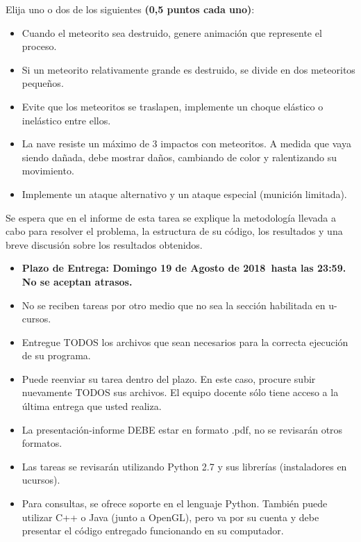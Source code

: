\documentclass[letterpaper,11pt]{article} %
\def\plazoentrega {Domingo 19 de Agosto de 2018}
\begin{document}

Elija uno o dos de los siguientes \textbf{(0,5 puntos cada uno)}:

\begin{itemize}
	\item Cuando el meteorito sea destruido, genere animación que represente el proceso.
	\item Si un meteorito relativamente grande es destruido, se divide en dos meteoritos pequeños.
	\item Evite que los meteoritos se traslapen, implemente un choque elástico o inelástico entre ellos.
	\item La nave resiste un máximo de 3 impactos con meteoritos. A medida que vaya siendo dañada, debe mostrar daños, cambiando de color y ralentizando su movimiento.
	\item Implemente un ataque alternativo y un ataque especial (munición limitada).
\end{itemize}


Se espera que en el informe de esta tarea se explique la metodología llevada a cabo para resolver el problema, la estructura de su código, los resultados y una breve discusión sobre los resultados obtenidos. 


\begin{itemize}
	\item \textbf{Plazo de Entrega: \plazoentrega \ hasta las 23:59. No se aceptan atrasos.}
	\item No se reciben tareas por otro medio que no sea la sección habilitada en u-cursos.
	\item Entregue TODOS los archivos que sean necesarios para la correcta ejecución de su programa.
	\item Puede reenviar su tarea dentro del plazo. En este caso, procure subir nuevamente TODOS sus archivos. El equipo docente sólo tiene acceso a la última entrega que usted realiza.
	\item La presentación-informe DEBE estar en formato .pdf, no se revisarán otros formatos.
	\item Las tareas se revisarán utilizando Python 2.7 y sus librerías (instaladores en ucursos).
	\item Para consultas, se ofrece soporte en el lenguaje Python. También puede utilizar C++ o Java (junto a OpenGL), pero va por su cuenta y debe presentar el código entregado funcionando en su computador.
\end{itemize}
\end{document}
